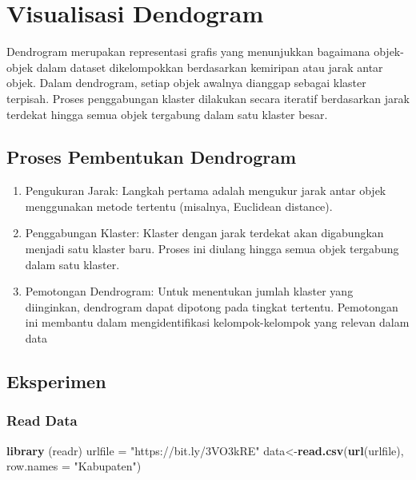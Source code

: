 \documentclass[
  oneside]{book}
\newenvironment{Shaded}{\begin{snugshade}}{\end{snugshade}}
\newcommand{\AttributeTok}[1]{\textcolor[rgb]{0.13,0.29,0.53}{#1}}
\newcommand{\FunctionTok}[1]{\textcolor[rgb]{0.13,0.29,0.53}{\textbf{#1}}}
\newcommand{\NormalTok}[1]{#1}
\newcommand{\OtherTok}[1]{\textcolor[rgb]{0.56,0.35,0.01}{#1}}
\newcommand{\StringTok}[1]{\textcolor[rgb]{0.31,0.60,0.02}{#1}}
\begin{document}
\chapter{Visualisasi Dendogram}\label{vizhc}

Dendrogram merupakan representasi grafis yang menunjukkan bagaimana objek-objek dalam dataset dikelompokkan berdasarkan kemiripan atau jarak antar objek. Dalam dendrogram, setiap objek awalnya dianggap sebagai klaster terpisah. Proses penggabungan klaster dilakukan secara iteratif berdasarkan jarak terdekat hingga semua objek tergabung dalam satu klaster besar.

\section{Proses Pembentukan Dendrogram}\label{proses-pembentukan-dendrogram}

\begin{enumerate}
\def\labelenumi{\arabic{enumi}.}
\item
  Pengukuran Jarak: Langkah pertama adalah mengukur jarak antar objek menggunakan metode tertentu (misalnya, Euclidean distance).
\item
  Penggabungan Klaster: Klaster dengan jarak terdekat akan digabungkan menjadi satu klaster baru. Proses ini diulang hingga semua objek tergabung dalam satu klaster.
\item
  Pemotongan Dendrogram: Untuk menentukan jumlah klaster yang diinginkan, dendrogram dapat dipotong pada tingkat tertentu. Pemotongan ini membantu dalam mengidentifikasi kelompok-kelompok yang relevan dalam data
\end{enumerate}

\section{Eksperimen}\label{eksperimen}

\subsection*{Read Data}\label{read-data}

\begin{Shaded}
\begin{Highlighting}[]
\FunctionTok{library}\NormalTok{ (readr)}
\NormalTok{urlfile }\OtherTok{=} \StringTok{"https://bit.ly/3VO3kRE"}
\NormalTok{data}\OtherTok{\textless{}{-}}\FunctionTok{read.csv}\NormalTok{(}\FunctionTok{url}\NormalTok{(urlfile), }\AttributeTok{row.names =} \StringTok{"Kabupaten"}\NormalTok{)}
\end{Highlighting}
\end{Shaded}
\end{document}
